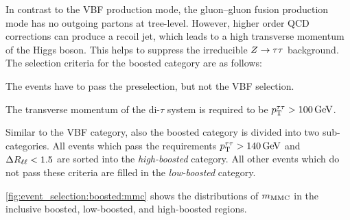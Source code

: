 In contrast to the VBF production mode, the gluon--gluon fusion production mode has no outgoing partons at tree-level.
However, higher order QCD corrections can produce a recoil jet, which leads to a high transverse momentum of the Higgs boson.
This helps to suppress the irreducible $Z \to \tau \tau$ background.
The selection criteria for the boosted category are as follows:
\begin{description}[style=nextline,leftmargin=1cm]
    \item[(1B) Veto on VBF selection]
        The events have to pass the preselection, but not the VBF selection.
    \item[(2B) Higgs boson transverse momentum]
        The transverse momentum of the di-$\tau$ system is required to be $\pt^{\tau\tau} > \unit[100]{GeV}$.
\end{description}
Similar to the VBF category, also the boosted category is divided into two sub-categories.
All events which pass the requirements $\pt^{\tau\tau} > \unit[140]{GeV}$ and $\Delta R_{\ell\ell} < 1.5$ are sorted
into the \emph{high-boosted} category. All other events which do not pass these criteria are filled in the
\emph{low-boosted} category.

\cref{fig:event_selection:boosted:mmc} shows the distributions of $m_\text{MMC}$ in the inclusive boosted, low-boosted, and high-boosted regions.

